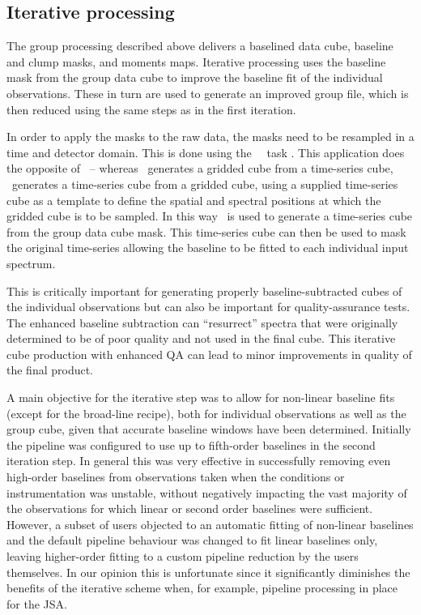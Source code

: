 \documentclass[final,authoryear,5p,times,twocolumn]{elsarticle}
\begin{document}
\subsection{Iterative processing}

The group processing described above delivers a baselined data cube,
baseline and clump masks, and moments maps. Iterative processing uses
the baseline mask from the group data cube to improve the baseline fit
of the individual observations. These in turn are used to generate an improved
group file, which is then reduced using the same steps as in the first iteration.

In order to apply the masks to the raw data, the masks need to be resampled
in a time and detector domain. This is done using the \smurf\ \unmakecube\ task
\citep[][]{SUN258}. This application
does the opposite of \makecube\ -- whereas \makecube\
generates a gridded cube from a time-series cube, \unmakecube\ generates
a time-series cube from a gridded cube, using a supplied time-series cube
as a template to define the spatial and spectral positions at which the
gridded cube is to be sampled. In this way \unmakecube\ is used to generate
a time-series cube from the group data cube mask. This time-series cube can
then be used to mask the original time-series allowing the baseline to be
fitted to each individual input spectrum.

This is critically important for generating properly baseline-subtracted
cubes of the individual observations but can also
be important for quality-assurance tests. The enhanced baseline
subtraction can ``resurrect'' spectra that were originally determined
to be of poor quality and not used in the final cube. This iterative
cube production with enhanced QA can lead to minor improvements in
quality of the final product.

A main objective for the iterative step was to allow for non-linear baseline fits
(except for the broad-line recipe), both for individual observations as well as
the group cube, given that accurate baseline windows have been determined.
Initially the pipeline was configured to use up to fifth-order baselines in
the second iteration step. In general this was very effective in successfully
removing even high-order baselines from observations taken when the
conditions or instrumentation was unstable, without negatively impacting
the vast majority of the observations for which linear or second order baselines
were sufficient.  However, a subset of users objected to an automatic fitting of
non-linear baselines and the default pipeline behaviour was changed to
fit linear baselines only, leaving higher-order fitting to a custom pipeline reduction
by the users themselves.  In our opinion this is unfortunate since it significantly
diminishes the benefits of the iterative scheme when, for example, pipeline processing
in place for the JSA.
\end{document}
